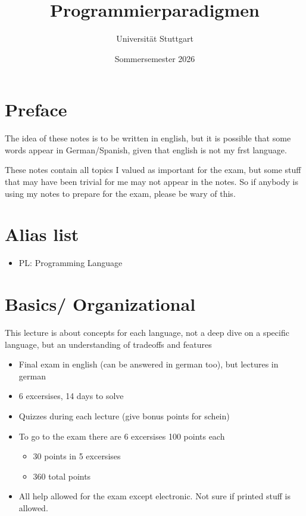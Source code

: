 \documentclass{article}
\begin{document}
\title{Programmierparadigmen}
\date{Sommersemester 2026}
\author{Universität Stuttgart}
\maketitle
\tableofcontents
\newpage

\section{Preface}
The idea of these notes is to be written in english, but it is possible that some words appear in German/Spanish, given that english is not my frst language.

These notes contain all topics I valued as important for the exam, but some stuff that may have been trivial for me may not appear in the notes. So if anybody is using my notes to 
prepare for the exam, please be wary of this.
\section{Alias list}
\begin{itemize}
  \item PL: Programming Language
\end{itemize}

\section{Basics/ Organizational}
This lecture is about concepts for each language, not a deep dive on a specific language, but an understanding of tradeoffs and features

\begin{itemize}
  \item Final exam in english (can be answered in german too), but lectures in german
  \item 6 excersises, 14 days to solve
  \item Quizzes during each lecture (give bonus points for schein)
  \item To go to the exam there are 6 excersises 100 points each
  \begin{itemize}
    \item 30 points in 5 excersises
    \item 360 total points
  \end{itemize}
  \item All help allowed for the exam except electronic. Not sure if printed stuff is allowed.
\end{itemize}
\end{document}
